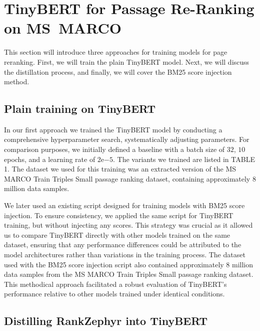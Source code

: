 \section{TinyBERT for Passage Re-Ranking on MS~MARCO}

This section will introduce three approaches for training models for page reranking. First, we will train the plain TinyBERT model. Next, we will discuss the distillation process, and finally, we will cover the BM25 score injection method.

\subsection{Plain training on TinyBERT}\label{plaintiny}

In our first approach we trained the TinyBERT model by conducting a comprehensive hyperparameter search, systematically adjusting parameters. For comparison purposes, we initially defined a baseline with a batch size of $32$, $10$ epochs, and a learning rate of $2\mathrm{e}{-5}$. The variants we trained are listed in {\color{red} TABLE 1}. The dataset we used for this training was an extracted version of the MS MARCO Train Triples Small passage ranking dataset, containing approximately 8 million data samples.

We later used an existing script designed for training models with BM25 score injection. To ensure consistency, we applied the same script for TinyBERT training, but without injecting any scores. This strategy was crucial as it allowed us to compare TinyBERT directly with other models trained on the same dataset, ensuring that any performance differences could be attributed to the model architectures rather than variations in the training process. The dataset used with the BM25 score injection script also contained approximately 8 million data samples from the MS MARCO Train Triples Small passage ranking dataset. This methodical approach facilitated a robust evaluation of TinyBERT's performance relative to other models trained under identical conditions.

\subsection{Distilling RankZephyr into TinyBERT}

